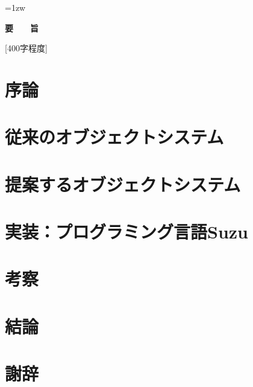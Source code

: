 \documentclass[a4paper,11pt,dvipdfmx]{jreport}
\title{\Underline{オブジェクト指向プログラミング言語Suzu}}
\author{林 拓人}
\begin{document}
\maketitle
\thispagestyle{empty}
\newpage

\thispagestyle{empty}
\vspace*{20pt plus 1fil}
\parindent=1zw
\noindent
\begin{center}
{\Large \bf 要　　旨}
\vspace{2cm}
\end{center}
[400字程度]

\par
\vspace{0pt plus 1fil}
\newpage

\tableofcontents
\listoffigures

\pagebreak \setcounter{page}{1}


\chapter{序論}


\chapter{従来のオブジェクトシステム}


\chapter{提案するオブジェクトシステム}


\chapter{実装：プログラミング言語Suzu}


\chapter{考察}


\chapter{結論}


\chapter*{謝辞}
\end{document}
